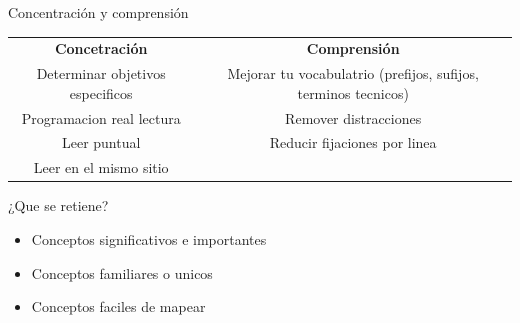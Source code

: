 \documentclass[
10pt,
aspectratio=169,
]{beamer}
\begin{document}
\begin{frame}[c]{Concentraci\'on y comprensi\'on}
\begin{table}
\begin{adjustbox}{width=\textwidth}
\begin{tabular}{ c c }
\textbf{Concetraci\'on} & \textbf{Comprensi\'on}\\
Determinar objetivos especificos & Mejorar tu vocabulatrio (prefijos, sufijos, terminos tecnicos) \\
Programacion real lectura & Remover distracciones \\
Leer puntual & Reducir fijaciones por linea \\
Leer en el mismo sitio & 
\end{tabular}
\end{adjustbox}
\end{table}
¿Que se retiene?
\begin{itemize}
\item Conceptos significativos e importantes
\item Conceptos familiares o unicos
\item Conceptos faciles de mapear
\end{itemize}
\end{frame}
\end{document}

